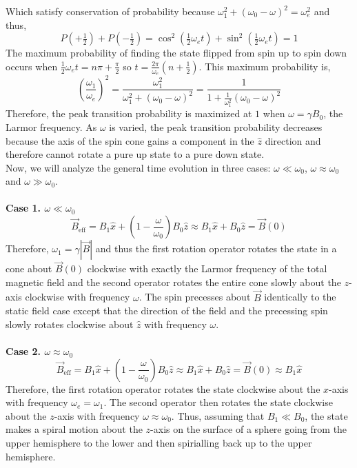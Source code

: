 \documentclass[12pt]{extarticle}
\begin{document}
Which satisfy conservation of probability because $\omega_1^2 + (\omega_0 - \omega)^2 = \omega_e^2$ and thus, \[P(+\tfrac{1}{2}) + P(-\tfrac{1}{2}) =  \cos^2{\left(\tfrac{1}{2} \omega_{e} t \right)} + \sin^2{\left(\tfrac{1}{2} \omega_{e} t \right)} = 1\]
The maximum probability of finding the state flipped from spin up to spin down occurs when $\frac{1}{2} \omega_e t = n \pi + \frac{\pi}{2}$ so $t = \frac{2\pi}{\omega_e} \left( n + \frac{1}{2} \right)$. This maximum probability is, 
\[\left(\frac{\omega_1}{\omega_{e}} \right)^2 = \frac{\omega_1^2}{\omega_1^2 + (\omega_0 - \omega)^2} = \frac{1}{1 + \frac{1}{\omega_1^2} (\omega_0 - \omega)^2} \]
Therefore, the peak transition probability is maximized at $1$ when $\omega = \gamma B_0$, the Larmor frequency. As $\omega$ is varied, the peak transition probability decreases because the axis of the spin cone gains a component in the $\hat{z}$ direction and therefore cannot rotate a pure up state to a pure down state. \bigskip \\
Now, we will analyze the general time evolution in three cases: $\omega \ll \omega_0$, $\omega \approx \omega_0$ and $\omega \gg \omega_0$. 
\\ \\ \textbf{Case 1. $\omega \ll \omega_0$} \\
\[\vec{B}_{\mathrm{eff}} = B_1 \hat{x} + \left(1 - \frac{\omega}{\omega_0} \right) B_0 \hat{z} \approx B_1 \hat{x} + B_0 \hat{z} = \vec{B}(0)\]
Therefore, $\omega_1 = \gamma |\vec{B}|$ and thus the first rotation operator rotates the state in a cone about $\vec{B}(0)$ clockwise with exactly the Larmor frequency of the total magnetic field and the second operator rotates the entire cone slowly about the $z$-axis clockwise with frequency $\omega$. The spin precesses about $\vec{B}$ identically to the static field case except that the direction of the field and the precessing spin slowly rotates clockwise about $\hat{z}$ with frequency $\omega$. 
\\ \\ \textbf{Case 2. $\omega \approx \omega_0$} \\
\[\vec{B}_{\mathrm{eff}} = B_1 \hat{x} + \left(1 - \frac{\omega}{\omega_0} \right) B_0 \hat{z} \approx B_1 \hat{x} + B_0 \hat{z} = \vec{B}(0) \approx B_1 \hat{x}\]
Therefore, the first rotation operator rotates the state clockwise about the $x$-axis with frequency $\omega_e = \omega_1$. The second operator then rotates the state clockwise about the $z$-axis with frequency $\omega \approx \omega_0$. Thus, assuming that $B_1 \ll B_0$, the state makes a spiral motion about the $z$-axis on the surface of a sphere going from the upper hemisphere to the lower and then spirialling back up to the upper hemisphere.
\end{document}
